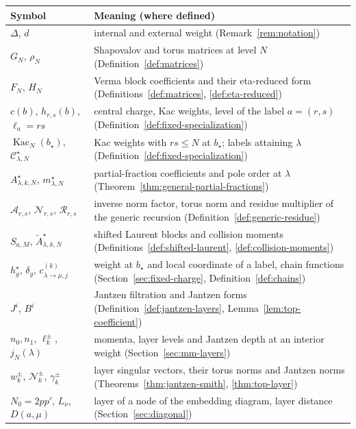 \documentclass[twoside,10pt]{article}
\numberwithin{equation}{section}
\theoremstyle{slbody}
\theoremstyle{definition}
\theoremstyle{remark}
\begin{document}
\begin{table}[p]
\centering
\small
\renewcommand{\arraystretch}{1.15}
\begin{tabular}{@{}p{}p{}@{}}
\hline
Symbol & Meaning (where defined)\\
\hline
\(\Delta\), \(d\) & internal and external weight (Remark~\ref{rem:notation})\\
\(G_N\), \(\rho_N\) & Shapovalov and torus matrices at level \(N\) (Definition~\ref{def:matrices})\\
\(F_N\), \(H_N\) & Verma block coefficients and their eta-reduced form (Definitions~\ref{def:matrices}, \ref{def:eta-reduced})\\
\(c(b)\), \(h_{r,s}(b)\), \(\ell_a=rs\) & central charge, Kac weights, level of the label \(a=(r,s)\) (Definition~\ref{def:fixed-specialization})\\
\(\operatorname{Kac}_N(b_\star)\), \({\mathcal C}^\star_{\lambda,N}\) & Kac weights with \(rs\leq N\) at \(b_\star\); labels attaining \(\lambda\) (Definition~\ref{def:fixed-specialization})\\
\(A^\star_{\lambda,k,N}\), \(m^\star_{\lambda,N}\) & partial-fraction coefficients and pole order at \(\lambda\) (Theorem~\ref{thm:general-partial-fractions})\\
\({\mathcal A}_{r,s}\), \({\mathcal N}_{r,s}\), \({\mathcal R}_{r,s}\) & inverse norm factor, torus norm and residue multiplier of the generic recursion (Definition~\ref{def:generic-residue})\\
\(S_{a,M}\), \(\widetilde A^\star_{\lambda,k,N}\) & shifted Laurent blocks and collision moments (Definitions~\ref{def:shifted-laurent}, \ref{def:collision-moments})\\
\(h^\star_g\), \(\delta_g\), \(c^{(k)}_{\lambda\to\mu,j}\) & weight at \(b_\star\) and local coordinate of a label, chain functions (Section~\ref{sec:fixed-charge}, Definition~\ref{def:chains})\\
\(J^i\), \(B^i\) & Jantzen filtration and Jantzen forms (Definition~\ref{def:jantzen-layers}, Lemma~\ref{lem:top-coefficient})\\
\(n_0,n_1\), \(\ell^\pm_k\), \(j_N(\lambda)\) & momenta, layer levels and Jantzen depth at an interior weight (Section~\ref{sec:mm-layers})\\
\(w^\pm_k\), \(\mathcal N^\pm_k\), \(\gamma^\pm_k\) & layer singular vectors, their torus norms and Jantzen norms (Theorems~\ref{thm:jantzen-smith}, \ref{thm:top-layer})\\
\(N_0=2pp'\), \(L_\nu\), \(D(a,\mu)\) & layer of a node of the embedding diagram, layer distance (Section~\ref{sec:diagonal})\\

\end{tabular}
\end{table}
\end{document}
